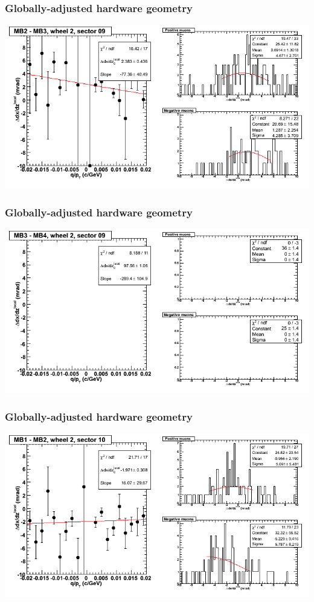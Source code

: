 \documentclass[compress]{beamer}
\begin{document}
\begin{frame}
\frametitle{Globally-adjusted hardware geometry}
\includegraphics[width=\linewidth]{NOV4_segdiffs_HW/dt13_slope_E_09_23.png}
\end{frame}

\begin{frame}
\frametitle{Globally-adjusted hardware geometry}
\includegraphics[width=\linewidth]{NOV4_segdiffs_HW/dt13_slope_E_09_34.png}
\end{frame}

\begin{frame}
\frametitle{Globally-adjusted hardware geometry}
\includegraphics[width=\linewidth]{NOV4_segdiffs_HW/dt13_slope_E_10_12.png}
\end{frame}
\end{document}
